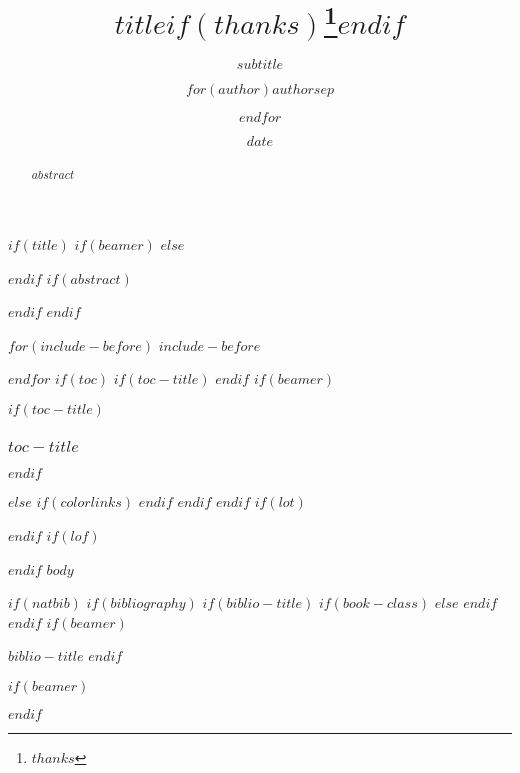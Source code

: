 \documentclass[
    $if(fontsize)$
    $fontsize$,
    $endif$
    $if(lang)$
    $babel-lang$,
    $endif$
    $if(papersize)$
    $papersize$paper,
    $endif$
    $for(classoption)$
    $classoption$$sep$,
    $endfor$
]{$documentclass$}
\title{$title$$if(thanks)$\thanks{$thanks$}$endif$}
\subtitle{$subtitle$}
\author{$for(author)$$author$$sep$ \and $endfor$}
\date{$date$}
\institute{$for(institute)$$institute$$sep$ \and $endfor$}
\begin{document}
                            $if(title)$
                            $if(beamer)$
                            \frame{\titlepage}
                            $else$
                            \maketitle
                            $endif$
                            $if(abstract)$
                            \begin{abstract}
                                $abstract$
                            \end{abstract}
                            $endif$
                            $endif$

                            $for(include-before)$
                            $include-before$

                            $endfor$
                            $if(toc)$
                            $if(toc-title)$
                            \renewcommand*\contentsname{$toc-title$}
                            $endif$
                            $if(beamer)$
                            \begin{frame}
                                $if(toc-title)$
                                \frametitle{$toc-title$}
                                $endif$
                                \tableofcontents[hideallsubsections]
                            \end{frame}
                            $else$
                            {
                                $if(colorlinks)$
                                \hypersetup{linkcolor=$if(toccolor)$$toccolor$$else$$endif$}
                                $endif$
                                \setcounter{tocdepth}{$toc-depth$}
                                \tableofcontents
                            }
                            $endif$
                            $endif$
                            $if(lot)$
                            \listoftables
                            $endif$
                            $if(lof)$
                            \listoffigures
                            $endif$
                            $body$

                            $if(natbib)$
                            $if(bibliography)$
                            $if(biblio-title)$
                            $if(book-class)$
                            \renewcommand\bibname{$biblio-title$}
                            $else$
                            \renewcommand\refname{$biblio-title$}
                            $endif$
                            $endif$
                            $if(beamer)$
                            \begin{frame}[allowframebreaks]{$biblio-title$}
                                \bibliographytrue
                                $endif$
                                
                                $if(beamer)$
                            \end{frame}
                            $endif$
\end{document}
